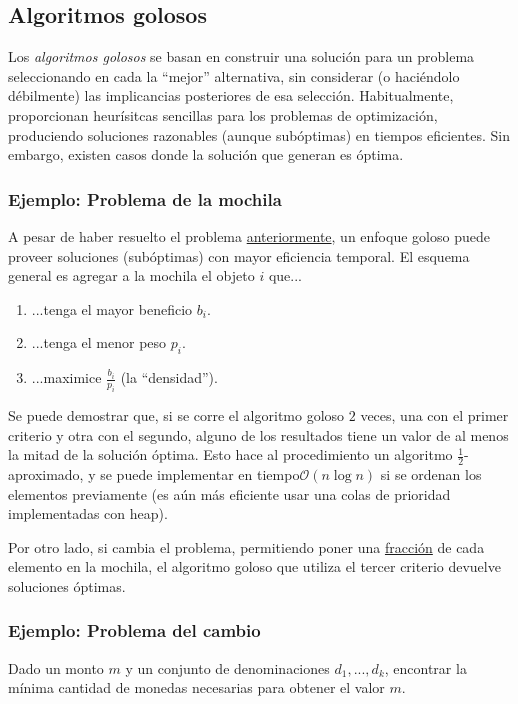 \documentclass[a4paper]{report}
\newcommand{\BigO}[1]{\ensuremath{\mathcal{O}(#1)}}
\begin{document}
\subsection{Algoritmos golosos}

Los \textit{algoritmos golosos} se basan en construir una solución para un problema seleccionando en cada la ``mejor'' alternativa, sin considerar (o haciéndolo débilmente) las implicancias posteriores de esa selección. Habitualmente, proporcionan heurísitcas sencillas para los problemas de optimización, produciendo soluciones razonables (aunque subóptimas) en tiempos eficientes. Sin embargo, existen casos donde la solución que generan es óptima.

\subsubsection{Ejemplo: Problema de la mochila}

A pesar de haber resuelto el problema \hyperref[problema-mochila]{anteriormente}, un enfoque goloso puede proveer soluciones (subóptimas) con mayor eficiencia temporal. El esquema general es agregar a la mochila el objeto $i$ que...
\begin{enumerate}
    \item ...tenga el mayor beneficio $b_i$.
    \item ...tenga el menor peso $p_i$.
    \item ...maximice $\frac{b_i}{p_i}$ (la ``densidad'').
\end{enumerate}

Se puede demostrar que, si se corre el algoritmo goloso $2$ veces, una con el primer criterio y otra con el segundo, alguno de los resultados tiene un valor de al menos la mitad de la solución óptima. Esto hace al procedimiento un algoritmo $\frac{1}{2}$-aproximado, y se puede implementar en tiempo\BigO{n\log{n}} si se ordenan los elementos previamente (es aún más eficiente usar una colas de prioridad implementadas con heap).

Por otro lado, si cambia el problema, permitiendo poner una \underline{fracción} de cada elemento en la mochila, el algoritmo goloso que utiliza el tercer criterio devuelve soluciones óptimas.

\subsubsection{Ejemplo: Problema del cambio}

\begin{problema}
    Dado un monto $m$ y un conjunto de denominaciones $d_1, ..., d_k$, encontrar la mínima cantidad de monedas necesarias para obtener el valor $m$.
\end{problema}
\end{document}
